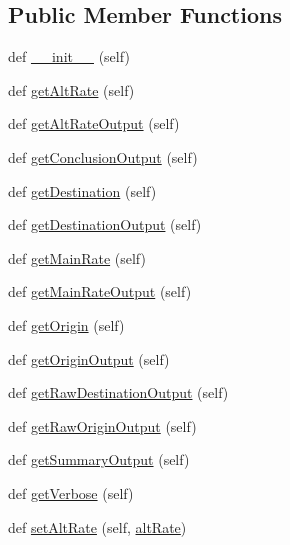 \subsection*{Public Member Functions}
\begin{DoxyCompactItemize}
\item 
def \hyperlink{classe2e_1_1_parameters_a335faddfa9af3ed8ac441e92faec0946}{\+\_\+\+\_\+init\+\_\+\+\_\+} (self)
\item 
def \hyperlink{classe2e_1_1_parameters_a2eb01ddbfa9f2b75f8d901196e260a52}{get\+Alt\+Rate} (self)
\item 
def \hyperlink{classe2e_1_1_parameters_acc3f1ce2de05c433834b52689c50cef6}{get\+Alt\+Rate\+Output} (self)
\item 
def \hyperlink{classe2e_1_1_parameters_ac4ff6b23493a25723cfe99fb7becf328}{get\+Conclusion\+Output} (self)
\item 
def \hyperlink{classe2e_1_1_parameters_ad984826a5973fff569b554b44245b714}{get\+Destination} (self)
\item 
def \hyperlink{classe2e_1_1_parameters_a4451a6d8224c2216fdef8e53e55fadaf}{get\+Destination\+Output} (self)
\item 
def \hyperlink{classe2e_1_1_parameters_a152d1d8c15164a06b54c3339bc9d15bf}{get\+Main\+Rate} (self)
\item 
def \hyperlink{classe2e_1_1_parameters_ae4d5b651e4e6434f0779f4661c163166}{get\+Main\+Rate\+Output} (self)
\item 
def \hyperlink{classe2e_1_1_parameters_ac570cc2f199bcb82a4634be79110a013}{get\+Origin} (self)
\item 
def \hyperlink{classe2e_1_1_parameters_af0cdd8e6726ccc72387e466c2abe04c2}{get\+Origin\+Output} (self)
\item 
def \hyperlink{classe2e_1_1_parameters_a0536c6870c6371025927f435e47704ed}{get\+Raw\+Destination\+Output} (self)
\item 
def \hyperlink{classe2e_1_1_parameters_a4ed96c7861e649d101984ff5c8056691}{get\+Raw\+Origin\+Output} (self)
\item 
def \hyperlink{classe2e_1_1_parameters_a46f3f35e99d7ce8a22fa34d66a348586}{get\+Summary\+Output} (self)
\item 
def \hyperlink{classe2e_1_1_parameters_a1e5e7e1986b641b01d4c24690a6d48eb}{get\+Verbose} (self)
\item 
def \hyperlink{classe2e_1_1_parameters_a1e73f515a94469c6b9c75a595d8ae426}{set\+Alt\+Rate} (self, \hyperlink{classe2e_1_1_parameters_a9d12e65d35b0807822c8774101ff613d}{alt\+Rate})
\item 

\end{DoxyCompactItemize}
